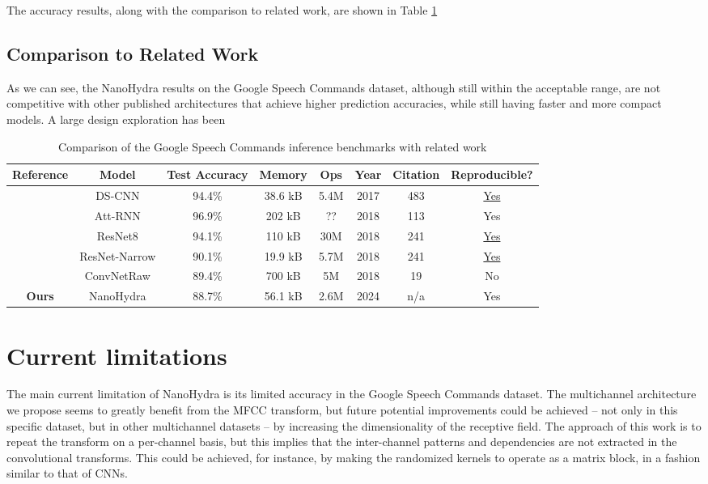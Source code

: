 The accuracy results, along with the comparison to related work, are shown in Table \ref{tbl:rs_speechcomms}


\subsection{Comparison to Related Work}
As we can see, the NanoHydra results on the Google Speech Commands dataset, although still within the 
acceptable range, are not competitive with other published architectures that achieve higher prediction accuracies, while
still having faster and more compact models. A large design exploration has been 
\begin{table}
\centerfloat
{}
    \begin{tabular}{ c c c c c c c c}
    \toprule
    Reference & Model & Test Accuracy & Memory & Ops & Year & Citation & Reproducible? \\

    \midrule
    \cite{Zhang2017}   &        DS-CNN & 94.4\% & 38.6 kB & 5.4M & 2017 & 483 &  \href{https://github.com/ARM-software/ML-KWS-for-MCU}{Yes} \\
    \cite{Andrade2018} &       Att-RNN & 96.9\% &  202 kB &   ?? & 2018 & 113 &  Yes \\
    \cite{Tang2018}    &       ResNet8 & 94.1\% &  110 kB &  30M & 2018 & 241 &  \href{https://github.com/castorini/honk/}{Yes} \\
    \cite{Tang2018}    & ResNet-Narrow & 90.1\% & 19.9 kB & 5.7M & 2018 & 241 &  \href{https://github.com/castorini/honk/}{Yes} \\
    \cite{Jansson2018} &    ConvNetRaw & 89.4\% &  700 kB &   5M & 2018 &  19 &  No \\
    \textbf{Ours}      &     NanoHydra & 88.7\% & 56.1 kB & 2.6M & 2024 & n/a &  Yes \\
    \bottomrule
\end{tabular}
\label{tbl:rs_speechcomms}
\caption{Comparison of the Google Speech Commands inference benchmarks with related work}
\end{table}

\section{Current limitations}
The main current limitation of NanoHydra is its limited accuracy in the Google Speech Commands dataset. The multichannel architecture we propose seems to greatly benefit from the MFCC transform, 
but future potential improvements could be achieved -- not only in this specific dataset, but in other multichannel datasets -- by increasing the dimensionality of the receptive field.
The approach of this work is to repeat the transform on a per-channel basis, but this implies that the inter-channel patterns and dependencies are not extracted in the convolutional transforms.
This could be achieved, for instance, by making the randomized kernels to operate as a matrix block, in a fashion similar to that of CNNs.
